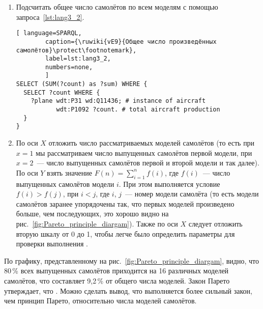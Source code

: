 \begin{enumerate} 
  \item Подсчитать общее число самолётов по всем моделям с помощью запроса~\ref{lst:lang3_2}.
  
\begin{lstlisting}[ language=SPARQL, 
        caption={\ruwiki{vE9}{Общее число произведённых самолётов}\protect\footnotemark}, 
        label=lst:lang3_2, 
        numbers=none, 
        ]
SELECT (SUM(?count) as ?sum) WHERE {
  SELECT ?count WHERE {
    ?plane wdt:P31 wd:Q11436; # instance of aircraft
		   wdt:P1092 ?count. # total aircraft production
  }
}
\end{lstlisting}
  
  
  \item По оси $X$ отложить число рассматриваемых моделей самолётов 
      (то есть при $x = 1$ мы рассматриваем число выпущенных самолётов первой модели, 
        при $x = 2$~--- число выпущенных самолётов первой и второй модели и так далее). 
        По оси $Y$ взять значение $F(n) = \sum\limits_{i=1}^n f(i)$, 
        где $f(i)$~--- число выпущенных самолётов модели $i$. 
        При этом выполняется условие $f(i) > f(j)$, при $i < j$, 
        где $i$, $j$~--- номер модели самолёта 
        (то есть модели самолётов заранее упорядочены так, что 
        первых моделей произведено больше, чем последующих, это хорошо видно на рис.~\ref{fig:Pareto_principle_diargam}). 
        Также по оси $X$ следует отложить вторую шкалу от 0 до 1, 
        чтобы легче было определить параметры для проверки выполнения .
\end{enumerate}

По графику, представленному на рис.~\ref{fig:Pareto_principle_diargam}, видно, 
что 80\,\% всех выпущенных самолётов приходится на 16 различных моделей самолётов, 
что составляет 9,2\,\% от общего числа моделей. 
Закон Парето утверждает, что 
. 
Можно сделать вывод, что выполняется более сильный закон, чем принцип Парето, относительно числа моделей самолётов.

